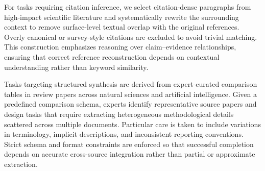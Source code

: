 For tasks requiring citation inference, we select citation-dense paragraphs from high-impact scientific literature and systematically rewrite the surrounding context to remove surface-level textual overlap with the original references. Overly canonical or survey-style citations are excluded to avoid trivial matching. This construction emphasizes reasoning over claim–evidence relationships, ensuring that correct reference reconstruction depends on contextual understanding rather than keyword similarity.

Tasks targeting structured synthesis are derived from expert-curated comparison tables in review papers across natural sciences and artificial intelligence. Given a predefined comparison schema, experts identify representative source papers and design tasks that require extracting heterogeneous methodological details scattered across multiple documents. Particular care is taken to include variations in terminology, implicit descriptions, and inconsistent reporting conventions. Strict schema and format constraints are enforced so that successful completion depends on accurate cross-source integration rather than partial or approximate extraction.




